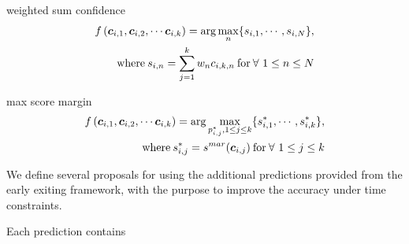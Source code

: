 \begin{enumdescript}
\begin{enumdescript}
				\item[weighted sum confidence]
				\begin{align}
				\begin{split}
					f\left(\bm{c}_{i,1}, \bm{c}_{i,2}, \cdots \bm{c}_{i,k} \right) = \arg \underset{n}{\max} \{s_{i,1}, \cdots, s_{i,N}\},\\ \text{where\:} s_{i,n} = \sum_{j=1}^{k}w_n c_{i,k,n} \text{\:for\:} \forall \ 1\le n \le N
				\end{split}	
				\end{align}
				
				\item[max score margin] 
				\begin{align}
				\begin{split}
				f\left(\bm{c}_{i,1}, \bm{c}_{i,2}, \cdots \bm{c}_{i,k} \right) = \arg \underset{{p_{i,j}^{*}, 1 \le j 
						\le k}}{\max} \{s^{*}_{i,1}, \cdots, s^{*}_{i,k}\},\\ \text{where\:} s^{*}_{i,j} = s^{mar}(\bm{c}_{i,j}) \text{\:for\:} \forall \ 1 \le j \le k
				\end{split}	
				\end{align}
		\end{enumdescript}
	\end{enumdescript}

We define several proposals for using the additional predictions provided from the early exiting framework, with the purpose to improve the accuracy under time constraints. 

Each prediction contains 





